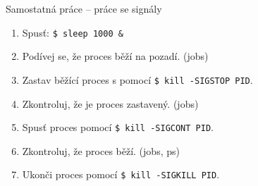 \documentclass{beamer}
\begin{document}
\begin{frame}[fragile]{Samostatná práce – práce se signály}
	
	\begin{enumerate}
		\item Spusť: \texttt{\$ sleep 1000 \&} 
		\item Podívej se, že proces běží na pozadí. (jobs)
		\item Zastav běžící proces s pomocí \texttt{\$ kill -SIGSTOP PID}.
		\item Zkontroluj, že je proces zastavený. (jobs)
		\item Spusť proces pomocí \texttt{\$ kill -SIGCONT PID}.
		\item Zkontroluj, že proces běží. (jobs, ps)
		\item Ukonči proces pomocí \texttt{\$ kill -SIGKILL PID}.
	\end{enumerate}			
\end{frame}
\end{document}
